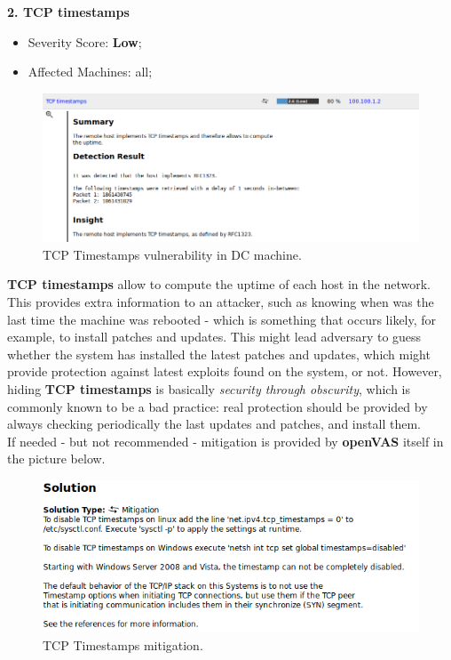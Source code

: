 \textbf{2. TCP timestamps}
\begin{itemize}
\item Severity Score: \textbf{Low};
\item Affected Machines: all;
\end{itemize}
\begin{figure}[!htb]
\centering
\begin{minipage}{.5\textwidth}
  \centering
  \includegraphics[width=1\textwidth]{tcpTimestampsVuln.png}
  \caption[a]{TCP Timestamps vulnerability in DC machine.}\label{fig:14}
\end{minipage}%
\end{figure}
\textbf{TCP timestamps} allow to compute the uptime of each host in the network. This provides extra information to an attacker, such as knowing when was the last time the machine was rebooted - which is something that occurs likely, for example, to install patches and updates. This might lead adversary to guess whether the system has installed the latest patches and updates, which might provide protection against latest exploits found on the system, or not. However, hiding \textbf{TCP timestamps} is basically \textit{security through obscurity}, which is commonly known to be a bad practice: real protection should be provided by always checking periodically the last updates and patches, and install them.\\
If needed - but not recommended - mitigation is provided by \textbf{openVAS} itself in the picture below.\\
\begin{figure}[!htb]
\centering
\begin{minipage}{.5\textwidth}
  \centering
  \includegraphics[width=1\textwidth]{tcpTimestampsVulnMitigation.png}
  \caption[a]{TCP Timestamps mitigation.}\label{fig:15}
\end{minipage}%
\end{figure}
